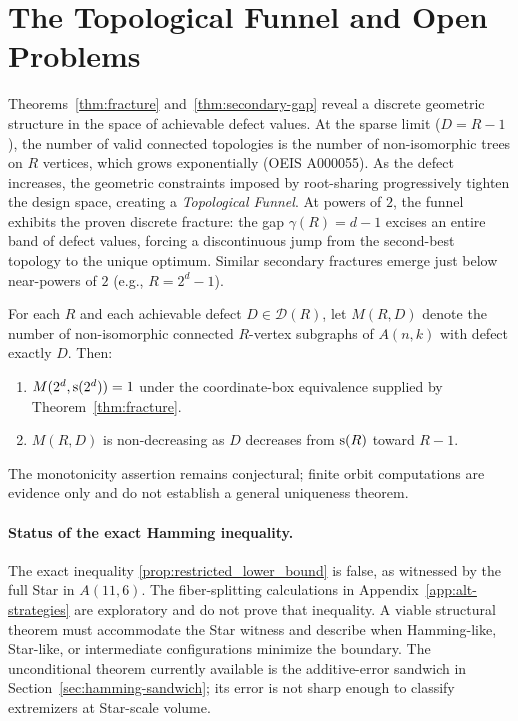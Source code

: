 \section{The Topological Funnel and Open Problems}\label{sec:funnel}

Theorems~\ref{thm:fracture} and~\ref{thm:secondary-gap} reveal a discrete
geometric structure in the
space of achievable defect values. At the sparse limit ($D = R-1$), the number
of valid connected topologies is the number of non-isomorphic trees on $R$
vertices, which grows exponentially (OEIS A000055). As the defect increases, the
geometric constraints imposed by root-sharing progressively tighten the design
space, creating a \emph{Topological Funnel}. At powers of $2$, the funnel
exhibits the proven discrete fracture: the gap
$\gamma(R) = d - 1$ excises an entire band of defect values, forcing a
discontinuous jump from the second-best topology to the unique optimum. Similar
secondary fractures emerge just below near-powers of $2$ (e.g., $R=2^d-1$).

\begin{conjecture}\label{conj:multiplicity}
For each $R$ and each achievable defect $D \in \mathcal{D}(R)$, let $M(R, D)$
denote the number of non-isomorphic connected $R$-vertex subgraphs of $A(n,k)$
with defect exactly $D$. Then:
	\begin{enumerate}
\item $M(2^d, \mathrm{s}(2^d)) = 1$ under the coordinate-box equivalence supplied
by Theorem~\ref{thm:fracture}.
\item $M(R, D)$ is non-decreasing as $D$ decreases from $\mathrm{s}(R)$ toward $R-1$.
	\end{enumerate}
\end{conjecture}

The monotonicity assertion remains conjectural; finite orbit computations are
evidence only and do not establish a general uniqueness theorem.

\paragraph{Status of the exact Hamming inequality.} The exact inequality
\ref{prop:restricted_lower_bound} is false, as witnessed by the full Star in
$A(11,6)$. The fiber-splitting calculations in
Appendix~\ref{app:alt-strategies} are exploratory and do not prove that
inequality. A viable structural theorem must accommodate the Star witness and
describe when Hamming-like, Star-like, or intermediate configurations
minimize the boundary. The unconditional theorem currently available is the
additive-error sandwich in Section~\ref{sec:hamming-sandwich}; its error is
not sharp enough to classify extremizers at Star-scale volume.

